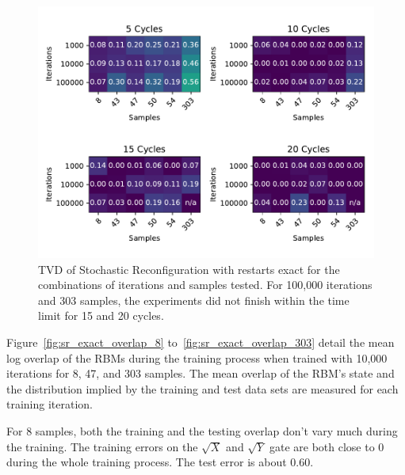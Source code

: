 \begin{figure}[H]
  \centering
  \includegraphics[width=\textwidth]{figures/results/SR-restarts-not-learned/fxeb_heatmap.pdf}
  \caption[Cross Entropy Difference of RBMs Trained with Stochastic Reconfiguration with Random Restarts and $CZ$ Gates Applied Exactly]{TVD of Stochastic 
  Reconfiguration with restarts exact for the combinations of iterations and samples tested.
  For 100,000 iterations and 303 samples, the experiments did not finish within the time limit for 15 and 20 cycles.}
  \label{fig:sr_exact_fxeb}
\end{figure}

Figure~\ref{fig:sr_exact_overlap_8} to~\ref{fig:sr_exact_overlap_303} detail the mean log overlap of the RBMs during the 
training process when trained with 10,000 iterations for 8, 47, and 303 samples. The 
mean overlap of the RBM's state and the distribution implied by the training and test data sets are measured 
for each training iteration.

For 8 samples, both the training and the testing overlap don't vary much during the training. The training errors on the $\sqrt{X}$ and 
$\sqrt{Y}$ gate are both close to 0 during the whole training process. The test error is about 0.60.

